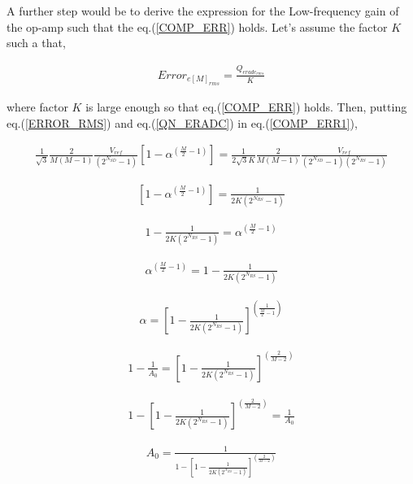 A further step would be to derive the expression for the Low-frequency gain of the op-amp such that the eq.(\ref{COMP_ERR}) holds. Let's assume the factor $K$ such a that, 

 \begin{align} \label{COMP_ERR1}
     Error_{e[M]_{rms}} = \frac{Q_{eradc_{rms}}}{K}
 \end{align}

where factor $K$ is large enough so that eq.(\ref{COMP_ERR}) holds. Then, putting eq.(\ref{ERROR_RMS}) and eq.(\ref{QN_ERADC}) in eq.(\ref{COMP_ERR1}),

 \begin{align*}
    \frac{1}{\sqrt{3}}\frac{2}{M(M-1)}\frac{V_{ref}}{\left(2^{N_{SD}}-1\right)}\left[1-\alpha^{\left( \frac{M}{2}-1\right)}\right]=\frac{1}{2\sqrt{3}K}\frac{2}{M(M-1)}\frac{V_{ref}}{\left(2^{N_{SD}}-1\right)\left(2^{N_{RS}}-1\right)}
\end{align*}

\begin{align*}
    \left[1-\alpha^{\left( \frac{M}{2}-1\right)}\right]=\frac{1}{2K\left(2^{N_{RS}}-1\right)}
\end{align*}

\begin{align*}
    1-\frac{1}{2K\left(2^{N_{RS}}-1\right)}=\alpha^{\left( \frac{M}{2}-1\right)}
\end{align*}

\begin{align*}
    \alpha^{\left( \frac{M}{2}-1\right)}=1-\frac{1}{2K\left(2^{N_{RS}}-1\right)}
\end{align*}

\begin{align*}
    \alpha=\left[1-\frac{1}{2K\left(2^{N_{RS}}-1\right)}\right]^{\left(\frac{1}{\frac{M}{2}-1}\right)}
\end{align*}

\begin{align*}
    1-\frac{1}{A_0}=\left[1-\frac{1}{2K\left(2^{N_{RS}}-1\right)}\right]^{\left(\frac{2}{M-2}\right)}
\end{align*}


\begin{align*}
  1-\left[1-\frac{1}{2K\left(2^{N_{RS}}-1\right)}\right]^{\left(\frac{2}{M-2}\right)}=\frac{1}{A_0}
\end{align*}

\begin{align*}
    A_0=\frac{1}{1-\left[1-\frac{1}{2K\left(2^{N_{RS}}-1\right)}\right]^{\left(\frac{2}{M-2}\right)}}
\end{align*}

